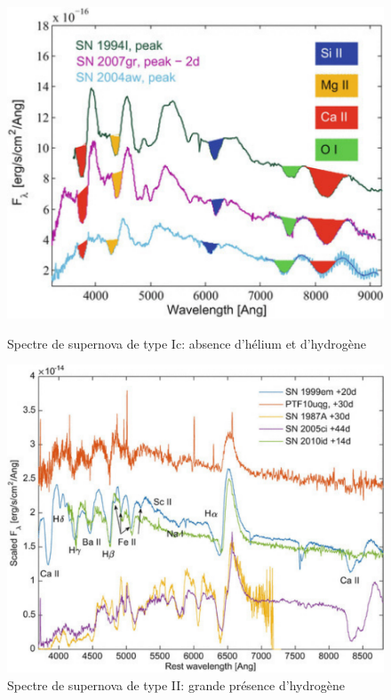 \vfill

\begin{figure}[H]
	\begin{minipage}[width=5cm]{.46\linewidth}
		\includegraphics[scale=0.49]{images/1c}
		\caption[Spectre de supernova de type Ic]{Spectre de supernova de type Ic: absence d'hélium et d'hydrogène}
	\end{minipage} \hfill
	\begin{minipage}[width=5cm]{.46\linewidth}
		\includegraphics[scale=0.40]{images/2}
		\caption[Spectre de supernova de type II]{Spectre de supernova de type II: grande présence d'hydrogène}
	\end{minipage}
\end{figure}






